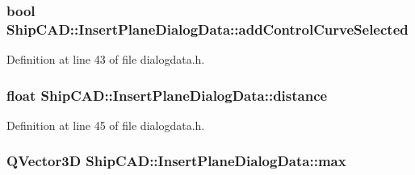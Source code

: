 \subsubsection[{\texorpdfstring{add\+Control\+Curve\+Selected}{addControlCurveSelected}}]{\setlength{\rightskip}{0pt plus 5cm}bool Ship\+C\+A\+D\+::\+Insert\+Plane\+Dialog\+Data\+::add\+Control\+Curve\+Selected}\hypertarget{structShipCAD_1_1InsertPlaneDialogData_a930de438c156597564b6ae33dcea03c3}{}\label{structShipCAD_1_1InsertPlaneDialogData_a930de438c156597564b6ae33dcea03c3}


Definition at line 43 of file dialogdata.\+h.

\subsubsection[{\texorpdfstring{distance}{distance}}]{\setlength{\rightskip}{0pt plus 5cm}float Ship\+C\+A\+D\+::\+Insert\+Plane\+Dialog\+Data\+::distance}\hypertarget{structShipCAD_1_1InsertPlaneDialogData_a73456e4622597dce48d16c05be358593}{}\label{structShipCAD_1_1InsertPlaneDialogData_a73456e4622597dce48d16c05be358593}


Definition at line 45 of file dialogdata.\+h.

\subsubsection[{\texorpdfstring{max}{max}}]{\setlength{\rightskip}{0pt plus 5cm}Q\+Vector3D Ship\+C\+A\+D\+::\+Insert\+Plane\+Dialog\+Data\+::max}\hypertarget{structShipCAD_1_1InsertPlaneDialogData_acef8dafcdd66649d8d0fa6fe6f8a7ea6}{}\label{structShipCAD_1_1InsertPlaneDialogData_acef8dafcdd66649d8d0fa6fe6f8a7ea6}


